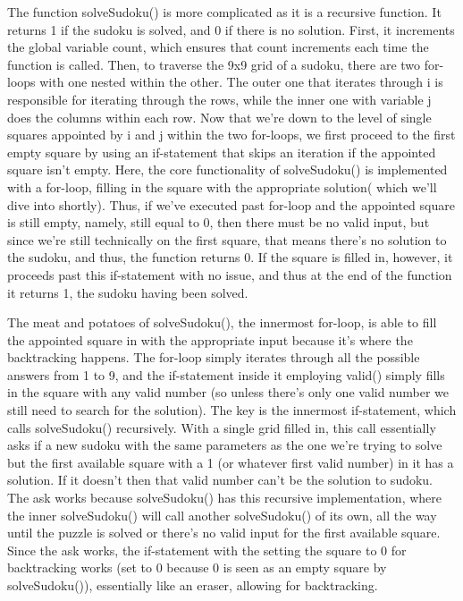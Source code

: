 \documentclass{article}
\begin{document}
The function solveSudoku() is more complicated as it is a recursive function. It returns 1 if the sudoku is solved, and 0 if there is no solution. First, it increments the global variable count, which ensures that count increments each time the function is called. Then, to traverse the 9x9 grid of a sudoku, there are two for-loops with one nested within the other. The outer one that iterates through i is responsible for iterating through the rows, while the inner one with variable j does the columns within each row. Now that we're down to the level of single squares appointed by i and j within the two for-loops, we first proceed to the first empty square by using an if-statement that skips an iteration if the appointed square isn't empty. Here, the core functionality of solveSudoku() is implemented with a for-loop, filling in the square with the appropriate solution( which we'll dive into shortly). Thus, if we've executed past for-loop and the appointed square is still empty, namely, still equal to 0, then there must be no valid input, but since we're still technically on the first square, that means there's no solution to the sudoku, and thus, the function returns 0. If the square is filled in, however, it proceeds past this if-statement with no issue, and thus at the end of the function it returns 1, the sudoku having been solved. 

The meat and potatoes of solveSudoku(), the innermost for-loop, is able to fill the appointed square in with the appropriate input because it's where the backtracking happens. The for-loop simply iterates through all the possible answers from 1 to 9, and the if-statement inside it employing valid() simply fills in the square with any valid number (so unless there's only one valid number we still need to search for the solution). The key is the innermost if-statement, which calls solveSudoku() recursively. With a single grid filled in, this call essentially asks if a new sudoku with the same parameters as the one we're trying to solve but the first available square with a 1 (or whatever first valid number) in it has a solution. If it doesn't then that valid number can't be the solution to sudoku. The ask works because solveSudoku() has this recursive implementation, where the inner solveSudoku() will call another solveSudoku() of its own, all the way until the puzzle is solved or there's no valid input for the first available square. Since the ask works, the if-statement with the setting the square to 0 for backtracking works (set to 0 because 0 is seen as an empty square by solveSudoku()), essentially like an eraser, allowing for backtracking. 
\end{document}

